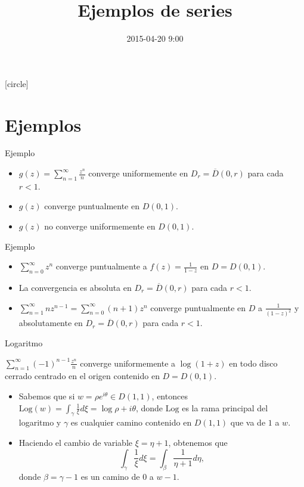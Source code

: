 \documentclass[spanish,presentation]{beamer}
\date{2015-04-20 9:00}
\title{Ejemplos de series}
\begin{document}
\maketitle
{}
[circle]

\tableofcontents

\section{Ejemplos}
\label{sec-1}

\begin{frame}[label=sec-1-1]{Ejemplo}
\begin{itemize}
\item \(g(z)=\sum_{n=1}^{\infty}\frac{z^{n}}{n}\) converge uniformemente en
\(D_{r}=\overline{D}(0,r)\) para cada \(r<1\).
\item \(g(z)\) converge puntualmente en \(D(0,1)\).
\item \(g(z)\) no converge uniformemente en \(D(0,1)\).
\end{itemize}
\end{frame}

\begin{frame}[label=sec-1-2]{Ejemplo}
\begin{itemize}
\item \(\sum_{n=0}^{\infty}z^{n}\) converge puntualmente a
\(f(z)=\frac{1}{1-z}\) en \(D=D(0,1)\).
\item La convergencia es absoluta en \(D_{r}=\overline{D}(0,r)\) para
cada \(r<1\).
\item \(\sum_{n=1}^{\infty}nz^{n-1}=\sum_{n=0}^{\infty}(n+1)z^{n}\)
converge puntualmente en \(D\) a \(\frac{1}{(1-z)^{2}}\) y
absolutamente en \(D_{r}=\overline{D}(0,r)\) para cada \(r<1\).
\end{itemize}
\end{frame}

\begin{frame}[label=sec-1-3]{Logaritmo}
\begin{exampleblock}{}
\(\sum_{n=1}^{\infty}(-1)^{n-1}\frac{z^{n}}{n}\) converge
 uniformemente a \(\log(1+z)\) en todo disco cerrado centrado en
 el origen contenido en \(D=D(0,1)\).
\end{exampleblock}

\begin{itemize}
\item Sabemos que si \(w=\rho e^{i\theta}\in D(1,1)\), entonces
\(\mathrm{Log}(w)=\int_{\gamma}\frac{1}{\xi}d\xi=\log
      \rho+i\theta\), donde \(\mathrm{Log}\) es la rama principal del
logaritmo y \(\gamma\) es cualquier camino contenido en
\(D(1,1)\) que va de \(1\) a \(w\).
\item Haciendo el cambio de variable \(\xi=\eta+1\), obtenemos que 
\begin{displaymath}
\int_{\gamma}\frac{1}{\xi}d\xi=\int_{\beta}\frac{1}{\eta+1}d\eta, 
\end{displaymath}
donde \(\beta=\gamma-1\) es un camino de \(0\) a \(w-1\).
\end{itemize}
\end{frame}
\end{document}
